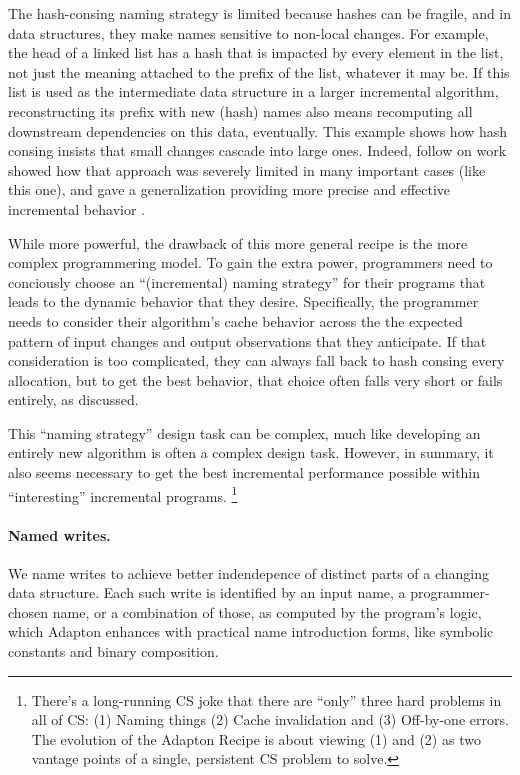 \documentclass[11pt]{article}
\begin{document}
The hash-consing naming strategy is limited because hashes can be
fragile, and in data structures, they make names sensitive to
non-local changes.
%
For example, the head of a linked list has a hash that is impacted by
every element in the list, not just the meaning attached to the prefix
of the list, whatever it may be.
%
If this list is used as the intermediate data structure in a larger
incremental algorithm, reconstructing its prefix with new (hash) names
also means recomputing all downstream dependencies on this data,
eventually.
%
This example shows how hash consing insists that small changes cascade
into large ones.
%
Indeed, follow on work showed how that approach was severely limited
in many important cases (like this one), and gave a generalization
providing more precise and effective incremental behavior
\cite{ICWithNames}.

While more powerful, the drawback of this more general recipe is the
more complex programmering model.
%
%
To gain the extra power, programmers need to conciously choose an
``(incremental) naming strategy'' for their programs that leads to the
dynamic behavior that they desire.
%
Specifically, the programmer needs to consider their algorithm's cache
behavior across the the expected pattern of input changes and output
observations that they anticipate.
%
If that consideration is too complicated, they can always fall back to
hash consing every allocation, but to get the best behavior, that
choice often falls very short or fails entirely, as discussed.

This ``naming strategy'' design task can be complex, much like
developing an entirely new algorithm is often a complex design task.
%
However, in summary, it also seems necessary to get the best
incremental performance possible within ``interesting'' incremental programs.
%
\footnote{ There's a long-running CS joke that there are ``only''
three hard problems in all of CS: (1) Naming things (2) Cache invalidation
and (3) Off-by-one errors.  The evolution of the Adapton Recipe is about viewing (1) and (2) as two vantage points of a single,
persistent CS problem to solve.  }

\paragraph{Named writes.}
We name writes to achieve better indendepence of distinct parts of a changing data structure.
%
Each such write is identified by an input name, a programmer-chosen name, or a combination of those, as computed by the program's logic, which Adapton enhances with practical name introduction forms, like symbolic constants and binary composition.
\end{document}
